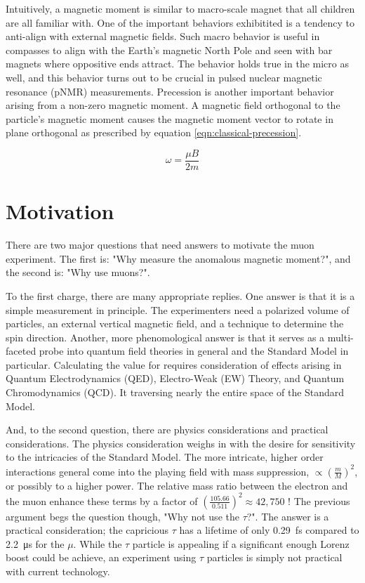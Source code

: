 Intuitively, a magnetic moment is similar to macro-scale magnet that all children are all familiar with.  One of the important behaviors exhibitited is a tendency to anti-align with external magnetic fields.  Such macro behavior is useful in compasses to align with the Earth's magnetic North Pole and seen with bar magnets where oppositive ends attract.  The behavior holds true in the micro as well, and this behavior turns out to be crucial in pulsed nuclear magnetic resonance (pNMR) measurements.  Precession is another important behavior arising from a non-zero magnetic moment.  A magnetic field orthogonal to the particle's magnetic moment causes the magnetic moment vector to rotate in plane orthogonal as prescribed by equation \ref{eqn:classical-precession}.

\begin{equation}
\label{eqn:classical-precession}
\omega = \frac{\mu B}{2 m}
\end{equation}

\section{Motivation}

There are two major questions that need answers to motivate the muon \gmtwo experiment.  The first is: "Why measure the anomalous magnetic moment?", and the second is: "Why use muons?".  

To the first charge, there are many appropriate replies.  One answer is that it is a simple measurement in principle.  The experimenters need a polarized volume of particles, an external vertical magnetic field, and a technique to determine the spin direction. Another, more phenomological answer is that it serves as a multi-faceted probe into quantum field theories in general and the Standard Model in particular.  Calculating the value for \gmtwo requires consideration of effects arising in Quantum Electrodynamics (QED), Electro-Weak (EW) Theory, and Quantum Chromodynamics (QCD).  It traversing nearly the entire space of the Standard Model.

And, to the second question, there are physics considerations and practical considerations.  The physics consideration weighs in with the desire for sensitivity to the intricacies of the Standard Model.  The more intricate, higher order interactions general come into the playing field with mass suppression, $\propto (\frac{m}{M})^2$, or possibly to a higher power.  The relative mass ratio between the electron and the muon enhance these terms by a factor of $(\frac{105.66}{0.511})^2 \approx 42,750$ !  The previous argument begs the question though, "Why not use the $\tau$?".  The answer is a practical consideration; the capricious $\tau$ has a lifetime of only \SI{0.29}{\femto\second} compared to \SI{2.2}{\micro\second} for the $\mu$.  While the $\tau$ particle is appealing if a significant enough Lorenz boost could be achieve, an experiment using $\tau$ particles is simply not practical with current technology.

